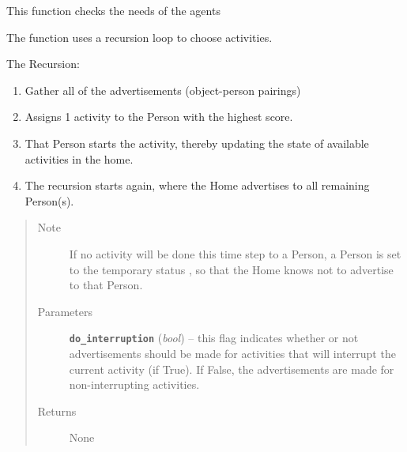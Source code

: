 \documentclass[letterpaper,10pt,english]{sphinxmanual}
\begin{document}
\begin{fulllineitems}
\begin{quote}
\begin{description}
\begin{itemize}
\end{itemize}

\end{description}\end{quote}

\begin{fulllineitems}
\label{universe:universe.Universe.address_needs}
This function checks the needs of the agents

The function uses a recursion loop to choose activities.

The Recursion:
\begin{enumerate}
\item {} 
Gather all of the advertisements (object-person pairings)

\item {} 
Assigns 1 activity to the Person with the highest score.

\item {} 
That Person starts the activity, thereby updating the state of available activities in the home.

\item {} 
The recursion starts again, where the Home advertises to all remaining Person(s).

\end{enumerate}
\begin{quote}\begin{description}
\item[{Note}] \leavevmode
If no activity will be done this time step to a Person, a Person is set to             the temporary status , so that the Home knows not to advertise to that Person.

\item[{Parameters}] \leavevmode
\textbf{\texttt{do\_interruption}} (\emph{bool}) -- this flag indicates whether or not advertisements should be made             for activities that will interrupt the current activity (if True). If False, the advertisements             are made for non-interrupting activities.

\item[{Returns}] \leavevmode
None

\end{description}\end{quote}

\end{fulllineitems}


\end{fulllineitems}
\end{document}
